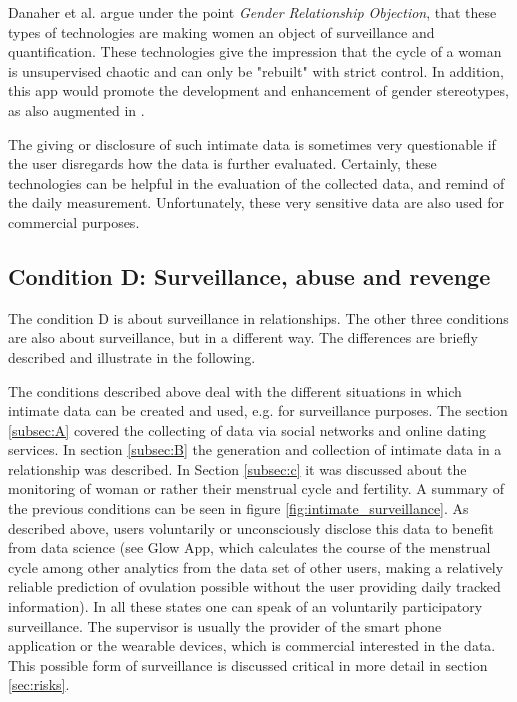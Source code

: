 Danaher et al. \cite{doi:10.1080/15265161.2017.1409823} argue under the point \textit{Gender Relationship Objection}, that these types of technologies are making women an object of surveillance and quantification. 
These technologies give the impression that the cycle of a woman is unsupervised chaotic and can only be "rebuilt" with strict control.
In addition, this app would promote the development and enhancement of gender stereotypes, as also augmented in \cite{doi:10.1080/13691058.2014.920528}.
 
The giving or disclosure of such intimate data is sometimes very questionable if the user disregards how the data is further evaluated. Certainly, these technologies can be helpful in the evaluation of the collected data, and remind of the daily measurement. Unfortunately, these very sensitive data are also used for commercial purposes.

\subsection{Condition D: Surveillance, abuse and revenge}
\label{subsec:D}
The condition D is about surveillance in relationships. The other three conditions are also about surveillance, but in a different way. The differences are briefly described and illustrate in the following.
 
The conditions described above deal with the different situations in which intimate data can be created and used, e.g. for surveillance purposes.
The section \ref{subsec:A} covered the collecting of data via social networks and online dating services. In section \ref{subsec:B} the generation and collection of intimate data in a relationship was described. In Section \ref{subsec:c} it was discussed about the monitoring of woman or rather their menstrual cycle and fertility.
A summary of the previous conditions can be seen in figure \ref{fig:intimate_surveillance}.
As described above, users voluntarily or unconsciously disclose this data to benefit from data science (see Glow App, which calculates the course of the menstrual cycle among other analytics from the data set of other users, making a relatively reliable prediction of ovulation possible without the user providing daily tracked information).
In all these states one can speak of an voluntarily participatory surveillance.
The supervisor is usually the provider of the smart phone application or the wearable devices, which is commercial interested in the data. This possible form of surveillance is discussed critical in more detail in section \ref{sec:risks}.

